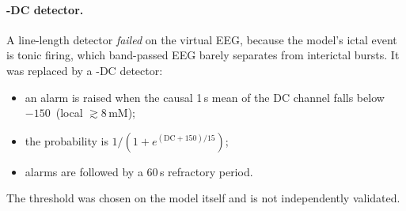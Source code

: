 \paragraph{\Kp-DC detector.} A line-length detector \emph{failed} on the virtual EEG, because the model's ictal event is tonic firing, which band-passed EEG barely separates from interictal bursts. It was replaced by a \Kp-DC detector:
\begin{itemize}
\item an alarm is raised when the causal 1\,s mean of the DC channel falls below $-150$\,\uV{} (local \Ko{} $\gtrsim$8\,mM);
\item the probability is $1/(1+e^{(\mathrm{DC}+150)/15})$;
\item alarms are followed by a 60\,s refractory period.
\end{itemize}
The threshold was chosen on the model itself and is not independently validated.

